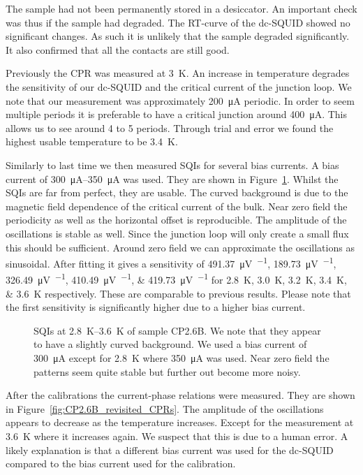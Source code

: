 The sample had not been permanently stored in a desiccator. An important check was thus if the sample had degraded. The RT-curve of the dc-SQUID showed no significant changes. As such it is unlikely that the sample degraded significantly. It also confirmed that all the contacts are still good.

Previously the CPR was measured at \qty{3}{\kelvin}. An increase in temperature degrades the sensitivity of our dc-SQUID and the critical current of the junction loop. We note that our measurement was approximately \qty{200}{\micro\ampere} periodic. In order to seem multiple periods it is preferable to have a critical junction around \qty{400}{\micro\ampere}. This allows us to see around 4 to 5 periods. Through trial and error we found the highest usable temperature to be \qty{3.4}{\kelvin}.

Similarly to last time we then measured SQIs for several bias currents. A bias current of \qtyrange{300}{350}{\micro\ampere} was used. They are shown in Figure~\ref{fig:CP2.6B_revisited_SQIs}. Whilst the SQIs are far from perfect, they are usable. The curved background is due to the magnetic field dependence of the critical current of the bulk. Near zero field the periodicity as well as the horizontal offset is reproducible. The amplitude of the oscillations is stable as well. Since the junction loop will only create a small flux this should be sufficient. Around zero field we can approximate the oscillations as sinusoidal. After fitting it gives a sensitivity of \qtylist{491.37;189.73;326.49;410.49;419.73}{\micro\volt\per\fluxquantum} for \qtylist{2.8;3.0;3.2;3.4;3.6}{\kelvin} respectively. These are comparable to previous results. Please note that the first sensitivity is significantly higher due to a higher bias current.

\begin{figure}[ht!]
	\centering
	
	\caption{SQIs at \qtyrange{2.8}{3.6}{\kelvin} of sample CP2.6B. We note that they appear to have a slightly curved background. We used a bias current of \qty{300}{\micro\ampere} except for \qty{2.8}{\kelvin} where \qty{350}{\micro\ampere} was used. Near zero field the patterns seem quite stable but further out become more noisy.}
	\label{fig:CP2.6B_revisited_SQIs}
\end{figure}

After the calibrations the current-phase relations were measured. They are shown in Figure~\ref{fig:CP2.6B_revisited_CPRs}. The amplitude of the oscillations appears to decrease as the temperature increases. Except for the measurement at \qty{3.6}{\kelvin} where it increases again. We suspect that this is due to a human error. A likely explanation is that a different bias current was used for the dc-SQUID compared to the bias current used for the calibration.

